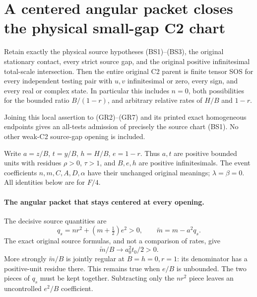 \section{A centered angular packet closes the physical small-gap C2 chart}
\label{sec:r13-small-gap-circuit}

\begin{theorem}
Retain exactly the physical source hypotheses (BS1)--(BS3), the
original stationary contact, every strict source gap, and the original
positive infinitesimal total-scale intersection. Then the entire
original C2 parent is finite tensor SOS for every independent testing
pair with $u,v$ infinitesimal or zero, every sign, and every real or
complex state. In particular this includes $n=0$, both possibilities
for the bounded ratio $B/(1-r)$, and arbitrary relative rates of
$H/B$ and $1-r$.

Joining this local assertion to (GR2)--(GR7) and its printed exact
homogeneous endpoints gives an all-tests admission of precisely the
source chart (BS1). No other weak-C2 source-gap opening is included.
\end{theorem}

Write $a=z/B$, $t=y/B$, $h=H/B$, $e=1-r$. Thus $a,t$ are
positive bounded units with residues $\rho>0$, $\tau>1$, and
$B,e,h$ are positive infinitesimals. The event coefficients $n,m,C,A,D,
\alpha$ have their unchanged original meanings; $\lambda=\beta=0$.
All identities below are for $F/4$.

\paragraph{The angular packet that stays centered at every opening.}
The decisive source quantities are
\[
 q_s=nr^2+(m+\tfrac12)e^2>0,\qquad
 \widetilde m=m-a^2q_s.                                      \tag{WC1}
\]
The exact original source formulas, and not a comparison of rates,
give
\[
 \widetilde m/B\longrightarrow a_0^2t_0/2>0.                 \tag{WC2}
\]
More strongly $\widetilde m/B$ is jointly regular at
$B=h=0,r=1$: its denominator has a positive-unit residue there.
This remains true when $e/B$ is unbounded. The two pieces of $q_s$
must be kept together. Subtracting only the $nr^2$ piece leaves an
uncontrolled $e^2/B$ coefficient.

